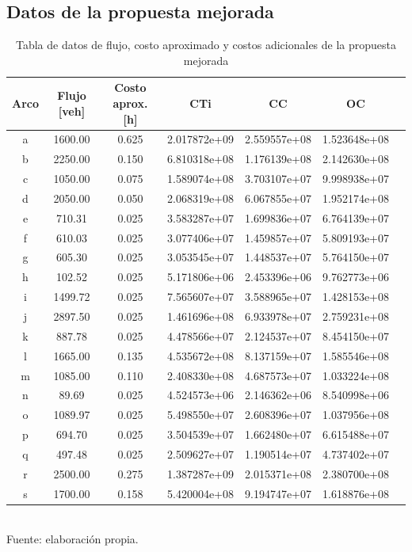 \documentclass[letterpaper,12pt]{article}
\begin{document}
\newpage
\subsection{Datos de la propuesta mejorada}
\begin{table}[H]
    \centering
    \caption{Tabla de datos de flujo, costo aproximado y costos adicionales de la propuesta mejorada}
    \begin{tabular}{ccccccc}
        \toprule
        \textbf{Arco} & \textbf{Flujo [veh]} & \textbf{Costo aprox. [h]} & \textbf{CTi} & \textbf{CC} & \textbf{OC} \\
        \midrule
        a & 1600.00 & 0.625 & 2.017872e+09 & 2.559557e+08 & 1.523648e+08 \\
        b & 2250.00 & 0.150 & 6.810318e+08 & 1.176139e+08 & 2.142630e+08 \\
        c & 1050.00 & 0.075 & 1.589074e+08 & 3.703107e+07 & 9.998938e+07 \\
        d & 2050.00 & 0.050 & 2.068319e+08 & 6.067855e+07 & 1.952174e+08 \\
        e & 710.31  & 0.025 & 3.583287e+07 & 1.699836e+07 & 6.764139e+07 \\
        f & 610.03  & 0.025 & 3.077406e+07 & 1.459857e+07 & 5.809193e+07 \\
        g & 605.30  & 0.025 & 3.053545e+07 & 1.448537e+07 & 5.764150e+07 \\
        h & 102.52  & 0.025 & 5.171806e+06 & 2.453396e+06 & 9.762773e+06 \\
        i & 1499.72 & 0.025 & 7.565607e+07 & 3.588965e+07 & 1.428153e+08 \\
        j & 2897.50 & 0.025 & 1.461696e+08 & 6.933978e+07 & 2.759231e+08 \\
        k & 887.78  & 0.025 & 4.478566e+07 & 2.124537e+07 & 8.454150e+07 \\
        l & 1665.00 & 0.135 & 4.535672e+08 & 8.137159e+07 & 1.585546e+08 \\
        m & 1085.00 & 0.110 & 2.408330e+08 & 4.687573e+07 & 1.033224e+08 \\
        n & 89.69   & 0.025 & 4.524573e+06 & 2.146362e+06 & 8.540998e+06 \\
        o & 1089.97 & 0.025 & 5.498550e+07 & 2.608396e+07 & 1.037956e+08 \\
        p & 694.70  & 0.025 & 3.504539e+07 & 1.662480e+07 & 6.615488e+07 \\
        q & 497.48  & 0.025 & 2.509627e+07 & 1.190514e+07 & 4.737402e+07 \\
        r & 2500.00 & 0.275 & 1.387287e+09 & 2.015371e+08 & 2.380700e+08 \\
        s & 1700.00 & 0.158 & 5.420004e+08 & 9.194747e+07 & 1.618876e+08 \\
        \bottomrule
    \end{tabular}
    \\
    Fuente: elaboración propia.
    \label{tab:datos}
\end{table}
\end{document}
